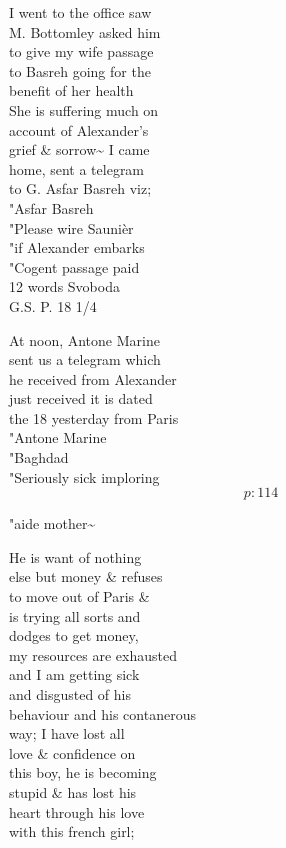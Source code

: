 \documentclass{report}
\begin{document}

	\par{
 	I went to the office saw\ \\M. Bottomley asked him\ \\to give my wife passage\ \\to Basreh going for the\ \\benefit of her health\ \\She is suffering much on\ \\account of Alexander's\ \\grief \& sorrow\~{} I came\ \\home, sent a telegram\ \\to G. Asfar Basreh viz;\ \\"Asfar Basreh\ \\"Please wire Saunièr\ \\"if Alexander embarks\ \\"Cogent passage paid\ \\12 words Svoboda\ \\G.S. P. 18 1/4\ \\
	}

	\par{
 	At noon, Antone Marine\ \\sent us a telegram which\ \\he received from Alexander\ \\just received it is dated\ \\the 18 yesterday from Paris\ \\"Antone Marine\ \\"Baghdad\ \\"Seriously sick imploring\ \\
  \[p: 114 \]

	}

	\par{
 	"aide mother\~{}\ \\
	}

	\par{
 	He is want of nothing\ \\else but money \& refuses\ \\to move out of Paris \&\ \\is trying all sorts and\ \\dodges to get money,\ \\my resources are exhausted\ \\and I am getting sick\ \\and disgusted of his\ \\behaviour and his contanerous\ \\way; I have lost all\ \\love \& confidence on\ \\this boy, he is becoming\ \\stupid \& has lost his\ \\heart through his love\ \\with this french girl;\ \\
	}
\end{document}
